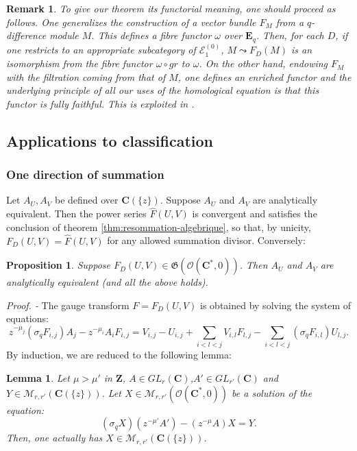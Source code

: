\documentclass[english]{smfart}
\newtheorem{lemma}[thm]{Lemma}
\newtheorem{prop}[thm]{Proposition}
\newtheorem{rmk}[thm]{Remark}
\numberwithin{equation}{thm}
\def \Pr {\textsl{Proof. - }}
\def\sq{\sigma_q}
\def\C{{\mathbf C}}
\def\Z{{\mathbf Z}}
\def\M{{\mathcal{M}}}
\def\Eq{{\mathbf{E}_{q}}}
\def\EE{{\mathcal{E}}}
\def\G{{\mathfrak{G}}}
\def\Ka{{\C(\{z\})}}
\def\Rwg{{\mathcal{O}(\C^{*},0)}}
\def\l{\left}
\def\r{\right}
\begin{document}
\begin{rmk} \label{rmk:fibre-functor}
To give our theorem its functorial meaning, one should proceed 
as follows. One generalizes the construction of a vector bundle
$F_{M}$ from a $q$-difference module $M$. This defines a fibre functor
$\omega$ over $\Eq$. Then, for each $D$, if one restricts to an appropriate 
subcategory of $\EE^{(0)}_{1}$, $M \leadsto F_{D}(M)$ is an
isomorphism from the fibre functor $\omega \circ gr$ to $\omega$. 
On the other hand, endowing $F_{M}$ with the filtration coming from 
that of $M$, one defines an enriched functor and the underlying
principle of all our uses of the homological equation is that 
this functor is fully faithful. This is exploited in \cite{JSIRR}.
\end{rmk}


\subsection{Applications to classification}

\subsubsection*{One direction of summation}

Let $A_{U},A_{V}$ be defined over $\Ka$. Suppose $A_{U}$ and $A_{V}$ 
are analytically equivalent. Then the power series $\hat{F}(U,V)$ 
is convergent and satisfies the conclusion of theorem
\ref{thm:resommation-algebrique}, so that, 
by unicity, $F_{D}(U,V) = \hat{F}(U,V)$ for any allowed summation divisor.
Conversely:

\begin{prop} \label{prop:tout-dans-les-poles} 
Suppose $F_{D}(U,V) \in \G(\Rwg)$. Then $A_{U}$ and $A_{V}$ are analytically 
equivalent (and all the above holds).
\end{prop}

\Pr 
The gauge transform $F = F_{D}(U,V)$ is obtained by solving the system
of equations:
$$
z^{-\mu_{j}} \l(\sq F_{i,j} \r) A_{j} - z^{-\mu_{i}} A_{i} F_{i,j} =
V_{i,j} - U_{i,j} + \sum_{i < l < j} V_{i,l} F_{l,j} - 
\sum_{i < l < j} \l(\sq F_{i,l}\r) U_{l,j}.
$$
By induction, we are reduced to the following lemma:

\begin{lemma}
Let $\mu > \mu'$ in $\Z$, $A \in GL_{r}(\C)$,$A' \in GL_{r'}(\C)$
and $Y \in \M_{r,r'}(\Ka)$. Let $X \in \M_{r,r'}(\Rwg)$ be a solution
of the equation:
$$
\l(\sq X \r) (z^{-\mu'} A') - (z^{-\mu} A) X = Y.
$$
Then, one actually has $X \in \M_{r,r'}(\Ka)$.
\end{lemma}
\end{document}
